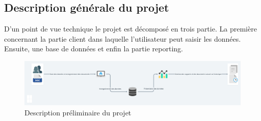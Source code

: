 \documentclass[a4paper]{report}
\begin{document}
\begin{doublespace}
\begin{doublespace}
        \subsection{Description générale du projet}
        D'un point de vue technique le projet est décomposé en trois partie. La
        première concernant la partie client dans laquelle l'utilisateur peut saisir
        les données. Ensuite, une base de données et enfin la partie reporting.
        \begin{figure}[H]
            \begin{center}
                \includegraphics[scale=0.2]{images/pre-descip-projet.png}
                \caption{Description préliminaire du projet}
            \end{center}
        \end{figure}

\end{doublespace}
\end{doublespace}
\end{document}
